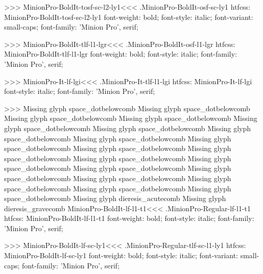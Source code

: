 {>>>
\<MinionPro-BoldIt-tosf-sc-l2-ly1\><<<
.MinionPro-BoldIt-osf-sc-ly1
htfcss:  MinionPro-BoldIt-tosf-sc-l2-ly1  font-weight: bold; font-style: italic; font-variant: small-caps; font-family: 'Minion Pro', serif;

>>>
\<MinionPro-BoldIt-tlf-l1-lgr\><<<
.MinionPro-BoldIt-osf-l1-lgr
htfcss:  MinionPro-BoldIt-tlf-l1-lgr  font-weight: bold; font-style: italic; font-family: 'Minion Pro', serif;

>>>
\<MinionPro-It-lf-lgi\><<<
.MinionPro-It-tlf-l1-lgi
htfcss:  MinionPro-It-lf-lgi  font-style: italic; font-family: 'Minion Pro', serif;

>>>
Missing glyph	space_dotbelowcomb
Missing glyph	space_dotbelowcomb
Missing glyph	space_dotbelowcomb
Missing glyph	space_dotbelowcomb
Missing glyph	space_dotbelowcomb
Missing glyph	space_dotbelowcomb
Missing glyph	space_dotbelowcomb
Missing glyph	space_dotbelowcomb
Missing glyph	space_dotbelowcomb
Missing glyph	space_dotbelowcomb
Missing glyph	space_dotbelowcomb
Missing glyph	space_dotbelowcomb
Missing glyph	space_dotbelowcomb
Missing glyph	space_dotbelowcomb
Missing glyph	space_dotbelowcomb
Missing glyph	space_dotbelowcomb
Missing glyph	space_dotbelowcomb
Missing glyph	space_dotbelowcomb
Missing glyph	space_dotbelowcomb
Missing glyph	dieresis_acutecomb
Missing glyph	dieresis_gravecomb
\<MinionPro-BoldIt-lf-l1-t1\><<<
.MinionPro-Regular-lf-l1-t1
htfcss:  MinionPro-BoldIt-lf-l1-t1  font-weight: bold; font-style: italic; font-family: 'Minion Pro', serif;

>>>
\<MinionPro-BoldIt-lf-sc-ly1\><<<
.MinionPro-Regular-tlf-sc-l1-ly1
htfcss:  MinionPro-BoldIt-lf-sc-ly1  font-weight: bold; font-style: italic; font-variant: small-caps; font-family: 'Minion Pro', serif;

}
